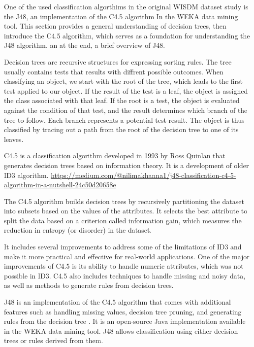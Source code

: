 One of the used classification algorthims in the original WISDM dataset study is the J48, an implementation of the C4.5 algorithm In the WEKA data mining tool. This section provides a general understanding of decision trees, then introduce the C4.5 algorithm, which serves as a foundation for understanding the J48 algorithm. an at the end, a brief overview of J48.
\medskip


Decision trees are recursive structures for expressing sorting rules. 
The tree usually contains tests that results with diffrent possible outcomes.
When classifying an object, we start with the root of the tree, which leads to the first test applied to our object. 
If the result of the test is a leaf, the object is assigned the class associated with that leaf.
If the root is a test, the object is evaluated against the condition of that test, and the result determines which branch of the tree to follow. Each branch represents a potential test result.
The object is thus classified by tracing out a path from the root of the decision tree to one of its leaves. \cite{Quinlan:1990}
\medskip

C4.5 is a classification algorithm developed in 1993 by Ross Quinlan that generates decision trees based on information theory. It is a development of older ID3 algorithm.
\url{https://medium.com/@nilimakhanna1/j48-classification-c4-5-algorithm-in-a-nutshell-24c50d20658e} 

The C4.5 algorithm builds decision trees by recursively partitioning the dataset into subsets based on the values of the attributes. It selects the best attribute to split the data based on a criterion called information gain, which measures the reduction in entropy (or disorder) in the dataset.

It includes several improvements to address some of the limitations of ID3 and make it more practical and effective for real-world applications.
One of the major improvements of C4.5 is its ability to handle numeric attributes, which was not possible in ID3. C4.5 also includes techniques to handle missing and noisy data, as well as methods to generate rules from decision trees. \cite{Witten:2011}

J48 is an implementation of the C4.5 algorithm that comes with additional features such as handling missing values, decision tree pruning, and generating rules from the decision tree \cite{Witten:2011}. It is an open-source Java implementation available in the WEKA data mining tool. J48 allows classification using either decision trees or rules derived from them.


